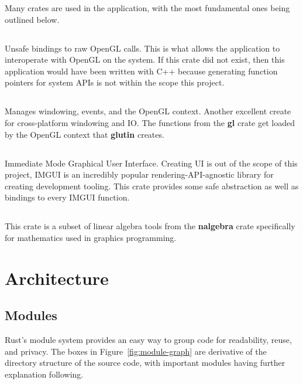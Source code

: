 \begin{multicols}{2}
  Many crates are used in the application, with the most fundamental ones being outlined below.

  \subsection{}
  Unsafe bindings to raw OpenGL calls.
  This is what allows the application to interoperate with OpenGL on the system.
  If this crate did not exist, then this application would have been written with C++ because generating function pointers for system APIs is not within the scope this project.

  \subsection{}
  Manages windowing, events, and the OpenGL context.
  Another excellent create for cross-platform windowing and IO\@.
  The functions from the \textbf{gl} crate get loaded by the OpenGL context that \textbf{glutin} creates.

  \subsection{}
  Immediate Mode Graphical User Interface.
  Creating UI is out of the scope of this project, IMGUI is an incredibly popular rendering-API-agnostic library for creating development tooling.
  This crate provides some safe abstraction as well as bindings to every IMGUI function.

  \subsection{}
  This crate is a subset of linear algebra tools from the \textbf{nalgebra} crate specifically for mathematics used in graphics programming.

  \section{Architecture}\label{architecture}

  \subsection{Modules}
  Rust's module system provides an easy way to group code for readability, reuse, and privacy.
  The boxes in Figure~\ref{fig:module-graph} are derivative of the directory structure of the source code, with important modules having further explanation following.


\end{multicols}
